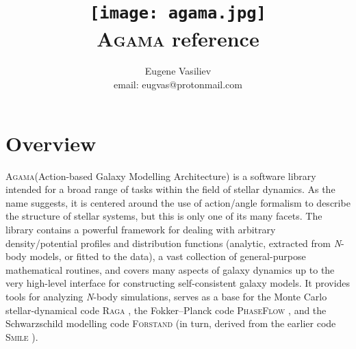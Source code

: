 \documentclass[12pt]{article}
\newcommand{\Agama}{\textsc{Agama}\xspace}
\newcommand{\Nbody}{\textsl{N}-body\xspace}
\begin{document}
\title{\vspace*{-14mm}
\texttt{[image: agama.jpg]}\protect\\[5mm]\Agama reference}
\author{Eugene Vasiliev\\
\normalsize\textrm{email: eugvas@protonmail.com} }

\maketitle
\vspace*{-10mm}
\tableofcontents
\newpage

\section{Overview}

\Agama (Action-based Galaxy Modelling Architecture) is a software library intended for a broad range of tasks within the field of stellar dynamics. As the name suggests, it is centered around the use of action/angle formalism to describe the structure of stellar systems, but this is only one of its many facets. The library contains a powerful framework for dealing with arbitrary density/potential profiles and distribution functions (analytic, extracted from \Nbody models, or fitted to the data), a vast collection of general-purpose mathematical routines, and covers many aspects of galaxy dynamics up to the very high-level interface for constructing self-consistent galaxy models. It provides tools for analyzing \Nbody simulations, serves as a base for the Monte Carlo stellar-dynamical code \textsc{Raga} \cite{Vasiliev2015}, the Fokker--Planck code \textsc{PhaseFlow} \cite{Vasiliev2017}, and the Schwarzschild modelling code \textsc{Forstand} \cite{VasilievValluri2020} (in turn, derived from the earlier code \textsc{Smile} \cite{Vasiliev2013,VasilievAthanassoula2015}).
\end{document}
